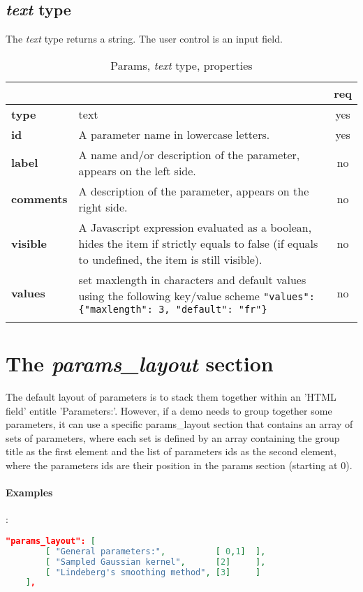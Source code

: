 \subsection{ \emph{text} type}

The \emph{text} type returns a string. The user control is an input field.

\begin{longtable}{|>{\bf}L{\linewidth}|L{\linewidth}|c|}
\hline
      &  & {\bf req} 
\tabularnewline \hline \hline
 type       & text   & yes \\ \hline
 id     & A parameter name in lowercase letters. & yes \\ \hline
 label  & A name and/or description of the parameter, appears on the left side. & no
                      \\ \hline
 comments & A description of the parameter, appears on the right side. & no
                      \\ \hline
 visible    & A Javascript expression evaluated as a boolean, hides the item if
              strictly equals to false (if equals to undefined, the item is still visible). 
            & no \\ \hline
 values     & set maxlength in characters and default values using the following key/value scheme \texttt{"values": \{"maxlength": 3, "default": "fr"\}} & no \\ \hline
\caption{Params, \emph{text} type, properties}
\end{longtable}


\section{The \emph{params\_layout} section}

The default layout of parameters is to stack them together within an 'HTML field'
entitle 'Parameters:'. However, if a demo needs to group together some parameters,
it can use a specific params\_layout section that contains an array of
sets of parameters, where each set is defined by an array containing the group 
title as the first element and the list of parameters ids as the second element,
where the parameters ids are their position in the params section (starting at 0).

\paragraph{Examples}:\\
\begin{lstlisting}[language=json,firstnumber=1]
  "params_layout": [
        [ "General parameters:",          [ 0,1]  ],
        [ "Sampled Gaussian kernel",      [2]     ],
        [ "Lindeberg's smoothing method", [3]     ]
    ],
\end{lstlisting}

